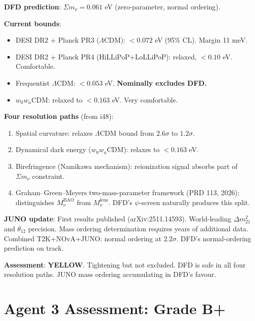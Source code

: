 \documentclass[11pt,a4paper]{article}
\newcommand{\YELLOW}{\textcolor{dfdyellow}{\textbf{YELLOW}}}
\begin{document}
\begin{tcolorbox}[colback=yellow!5!white, colframe=yellow!60!black,
  title={$\Sigma m_\nu$: DFD 0.061 eV vs Cosmological Bounds --- i49 Update}]

\textbf{DFD prediction}: $\Sigma m_\nu = 0.061$ eV (zero-parameter, normal ordering).

\textbf{Current bounds}:
\begin{itemize}
\item DESI DR2 + Planck PR3 ($\Lambda$CDM): $< 0.072$ eV (95\% CL). Margin 11 meV.
\item DESI DR2 + Planck PR4 (HiLLiPoP+LoLLiPoP): relaxed, $< 0.10$ eV. Comfortable.
\item Frequentist $\Lambda$CDM: $< 0.053$ eV. \textbf{Nominally excludes DFD.}
\item $w_0 w_a$CDM: relaxed to $< 0.163$ eV. Very comfortable.
\end{itemize}

\textbf{Four resolution paths} (from i48):
\begin{enumerate}
\item Spatial curvature: relaxes $\Lambda$CDM bound from $2.6\sigma$ to $1.2\sigma$.
\item Dynamical dark energy ($w_0 w_a$CDM): relaxes to $< 0.163$ eV.
\item Birefringence (Namikawa mechanism): reionization signal absorbs part of $\Sigma m_\nu$ constraint.
\item Graham--Green--Meyers two-mass-parameter framework (PRD 113, 2026): distinguishes $M_\nu^{\text{BAO}}$ from $M_\nu^{\text{lens}}$. DFD's $\psi$-screen naturally produces this split.
\end{enumerate}

\textbf{JUNO update}: First results published (arXiv:2511.14593). World-leading $\Delta m^2_{21}$ and $\theta_{12}$ precision. Mass ordering determination requires years of additional data. Combined T2K+NOvA+JUNO: normal ordering at $2.2\sigma$. DFD's normal-ordering prediction on track.

\textbf{Assessment}: \YELLOW. Tightening but not excluded. DFD is safe in all four resolution paths. JUNO mass ordering accumulating in DFD's favour.
\end{tcolorbox}

\section{Agent 3 Assessment: Grade B+}
\end{document}
